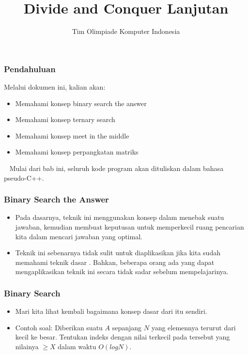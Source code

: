 

\title{Divide and Conquer Lanjutan}
\author{Tim Olimpiade Komputer Indonesia}
\date{}



\begin{frame}
\titlepage
\end{frame}

\begin{frame}
\frametitle{Pendahuluan}
Melalui dokumen ini, kalian akan:
\begin{itemize}
  \item Memahami konsep binary search the answer
  \item Memahami konsep ternary search
  \item Memahami konsep meet in the middle
  \item Memahami konsep perpangkatan matriks
\end{itemize}
~\newline
Mulai dari bab ini, seluruh kode program akan dituliskan dalam bahasa pseudo-C++.
\end{frame}

\begin{frame}
\frametitle{Binary Search the Answer}
\begin{itemize}
  \item Pada dasarnya, teknik ini menggunakan konsep \fbinarySearch dalam menebak suatu jawaban, kemudian membuat keputusan untuk memperkecil ruang pencarian kita dalam mencari jawaban yang optimal.
  \item Teknik ini sebenarnya tidak sulit untuk diaplikasikan jika kita sudah memahami teknik dasar \fbinarySearch. Bahkan, beberapa orang ada yang dapat mengaplikasikan teknik ini secara tidak sadar sebelum mempelajarinya.
\end{itemize}
\end{frame}

\begin{frame}
\frametitle{Binary Search}
\begin{itemize}
  \item Mari kita lihat kembali bagaimana konsep dasar dari \fbinarySearch itu sendiri.
  \item Contoh soal: Diberikan suatu \farray $A$ sepanjang $N$ yang elemennya terurut dari kecil ke besar. Tentukan indeks dengan nilai terkecil pada \farray tersebut yang nilainya $ \ge X$ dalam waktu $O(log N)$.
\end{itemize}
\end{frame}

